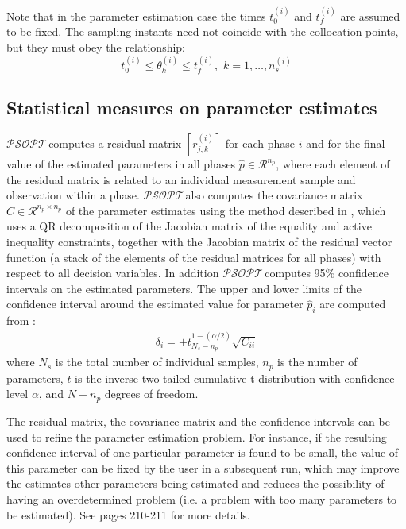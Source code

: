 \documentclass[a4paper,11pt]{report}    %
\newcommand{\psopt}{$\mathcal{PSOPT}$\,}  %
\newcommand{\RE}{\mathcal{R}}
\begin{document}
Note that in the parameter estimation case  the times $t_0^{(i)}$ and $t_f^{(i)}$ are assumed to be fixed. The sampling instants need not coincide 
with the collocation points, but they must obey the relationship:
\[
  t_0^{(i)} \le \theta_{k}^{(i)} \le t_f^{(i)}, \,\, k=1,\ldots,n_s^{(i)}
\]


\subsection{Statistical measures on parameter estimates}

\psopt computes a  residual matrix $[r_{j,k}^{(i)}]$ for each phase $i$ and for the final value of the estimated parameters 
in all phases $\hat p \in \RE^{n_p}$, 
where each element  of the residual matrix is related to an individual measurement sample and observation within a phase.
\psopt also computes the covariance matrix $C \in \RE^{n_p\times n_p}$ of the parameter estimates using the method described in \cite{Kostina:09},
which uses a QR decomposition of the Jacobian matrix of the equality and active inequality constraints, together with 
the Jacobian matrix of the residual vector function (a stack of the elements of the residual matrices for all phases) 
with respect to all decision variables. 
In addition \psopt computes 95\% confidence 
intervals on the estimated parameters.
The upper and lower limits of the confidence interval around the estimated value for parameter $\hat p_i$ are computed from \cite{Marsili-Liberti:03}:
\begin{equation}
 \begin{aligned}
    \delta_i = \pm t_{N_s-n_p}^{1-(\alpha/2)} \sqrt{C_{ii}}
 \end{aligned}
\end{equation}
where $N_s$ is the total number of individual samples, $n_p$ is the number of parameters, $t$ is the inverse two tailed cumulative t-distribution with
confidence level $\alpha$, and $N-n_p$ degrees of freedom. 

The residual matrix,  the covariance matrix and the confidence intervals can be used to refine the parameter estimation problem.
For instance, if the resulting confidence interval of one particular parameter is found to be small, the value
of this parameter can be fixed by the user in a subsequent run, which may improve the estimates other parameters
being estimated and reduces the possibility of having an overdetermined problem (i.e. a problem with too many parameters 
to be estimated). See \cite{Schittkowski:02} pages 210-211 for more details.
\end{document}
